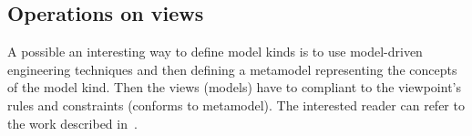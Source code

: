 %
%
%
%
%
%
%
%
%
%
%
%


\subsection{Operations on views}\label{Opns}

A possible an interesting way to define model kinds is to use model-driven engineering techniques and then defining a metamodel representing the concepts of the model kind. Then the views (models) have to compliant to the viewpoint's rules and constraints (conforms to metamodel). The interested reader can refer to the work described in~\cite{MEGAF2010,MEGAF2012}.

